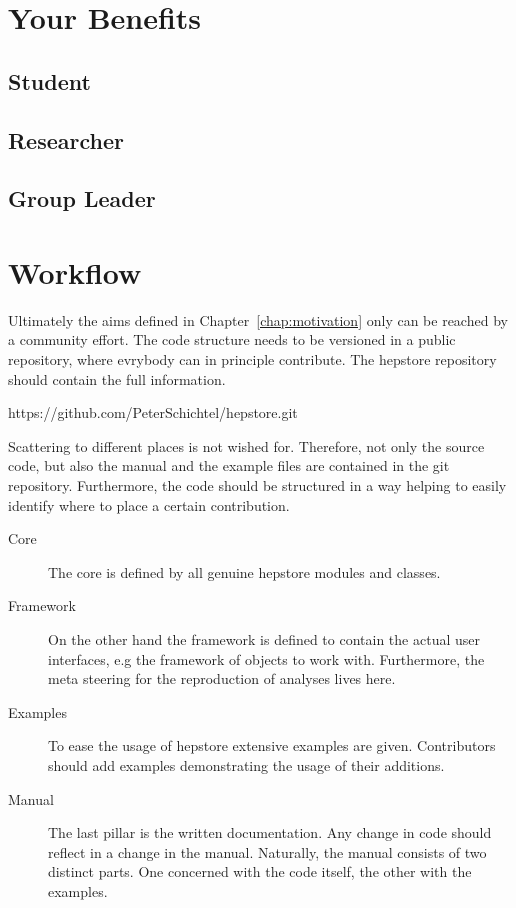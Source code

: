


\section{Your Benefits}
\subsection{Student}
\subsection{Researcher}
\subsection{Group Leader}

\section{Workflow}

Ultimately the aims defined in Chapter~\ref{chap:motivation} only can
be reached by a community effort. The code structure needs to be
versioned in a public repository, where evrybody can in principle
contribute. The hepstore repository should contain the full
information.
%
\begin{framed}
  \begin{center}
    https://github.com/PeterSchichtel/hepstore.git
  \end{center}
\end{framed}
%
Scattering to different places is not wished for. Therefore, not only
the source code, but also the manual and the example files are
contained in the git repository. Furthermore, the code should be
structured in a way helping to easily identify where to place a
certain contribution.


\begin{description}
\item[Core] The core is defined by all genuine hepstore modules and
  classes.\\
\item[Framework] On the other hand the framework is defined to contain
  the actual user interfaces, e.g the framework of objects to work
  with. Furthermore, the meta steering for the reproduction of
  analyses lives here.
\end{description}
%


%
\begin{description}
\item[Examples] To ease the usage of hepstore extensive examples are
  given. Contributors should add examples demonstrating the usage of
  their additions.\\
\item[Manual] The last pillar is the written documentation. Any change
  in code should reflect in a change in the manual. Naturally, the
  manual consists of two distinct parts. One concerned with the code
  itself, the other with the examples.
\end{description}
%
